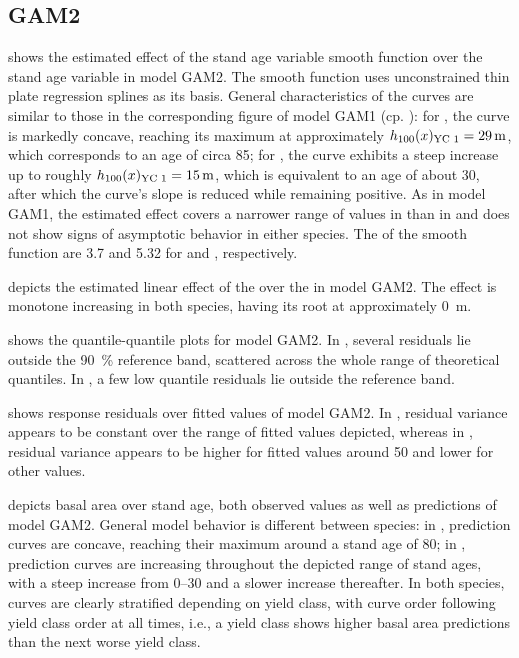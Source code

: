 \subsection{GAM2}

 shows the estimated effect of the stand age variable smooth function over the stand age variable in model GAM2.  The smooth function uses unconstrained thin plate regression splines as its basis.  General characteristics of the curves are similar to those in the corresponding figure of model GAM1 (cp. ):  for \Beech{}, the curve is markedly concave, reaching its maximum at approximately \(h_{100}(x)_{\text{YC 1}}{} = \SI{29}{\meter}\), which corresponds to an age of circa \SI{85}{\year};  for \Spruce{}, the curve exhibits a steep increase up to roughly \(h_{100}(x)_{\text{YC 1}}{} = \SI{15}{\meter}\), which is equivalent to an age of about \SI{30}{\year}, after which the curve’s slope is reduced while remaining positive.  As in model GAM1, the estimated effect covers a narrower range of values in \Beech{} than in \Spruce{} and does not show signs of asymptotic behavior in either species.  The \edf{} of the smooth function are \num{3.7} and \num{5.32} for \Beech{} and \Spruce{}, respectively.

 depicts the estimated linear effect of the \ProductivityIndexVariableText{} over the \ProductivityIndexVariableText{} in model GAM2.  The effect is monotone increasing in both species, having its root at approximately \SI{0}{\meter}.

 shows the quantile-quantile plots for model GAM2.  In \Beech{}, several residuals lie outside the \SI{90}{\percent} reference band, scattered across the whole range of theoretical quantiles.  In \Spruce{}, a few  low quantile residuals lie outside the reference band.

 shows response residuals over fitted values of model GAM2.   In \Beech{}, residual variance appears to be constant over the range of fitted values depicted, whereas in \Spruce{}, residual variance appears to be higher for fitted values around \num{50} and lower for other values.

 depicts basal area over stand age, both observed values as well as predictions of model GAM2.  General model behavior is different between species:  in \Beech{}, prediction curves are concave, reaching their maximum around a stand age of \SI{80}{\year};  in \Spruce{}, prediction curves are increasing throughout the depicted range of stand ages, with a steep increase from \SIrange{0}{30}{\year} and a slower increase thereafter.  In both species, curves are clearly stratified depending on yield class, with curve order following yield class order at all times, i.e., a yield class shows higher basal area predictions than the next worse yield class.

